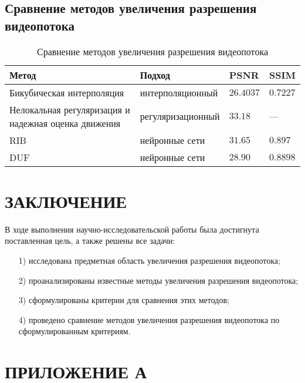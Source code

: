 \documentclass{bmstu}
\begin{document}
\section{Сравнение методов увеличения разрешения видеопотока}

\begin{table}[H]
\caption{Сравнение методов увеличения разрешения видеопотока}
\label{tabular:comparison}
\begin{tabular}{|p{4cm}|p{4.25cm}|p{3cm}|p{3cm}|}
\hline
\textbf{Метод} & \textbf{Подход} & \textbf{PSNR} & \textbf{SSIM}
\tabularnewline
\hline
Бикубическая интерполяция & интерполяционный & $26.4037$ & $0.7227$
\tabularnewline
\hline
Нелокальная регуляризация и надежная оценка движения & регуляризационный & $33.18$ & ---
\tabularnewline
\hline
RIB & нейронные сети & $31.65$ & $0.897$
\tabularnewline
\hline
DUF & нейронные сети & $28.90$ & $0.8898$
\tabularnewline
\hline
\end{tabular}
\end{table}

{\centering \chapter*{ЗАКЛЮЧЕНИЕ}}

В ходе выполнения научно-исследовательской работы была достигнута поставленная цель, а также решены все задачи:
\begin{enumerate}
\item[1)] исследована предметная область увеличения разрешения видеопотока;
\item[2)] проанализированы известные методы увеличения разрешения видеопотока;
\item[3)] сформулированы критерии для сравнения этих методов;
\item[4)] проведено сравнение методов увеличения разрешения видеопотока по сформулированным критериям.
\end{enumerate}

{\centering {\center\printbibliography[title=СПИСОК ИСПОЛЬЗОВАННЫХ ИСТОЧНИКОВ]}}

{\centering \chapter*{ПРИЛОЖЕНИЕ А}}
\end{document}
